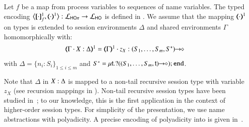 \documentclass[runningheads]{llncs}
\begin{document}
{\begin{definition}
\label{d:enc:hopitoho}
Let $f$ be a map from process variables to sequences of name variables.
%
The typed encoding 
$\enco{\map{\cdot}^{1}_f, \mapt{\cdot}^{1} %
}: \tyl{L}_{\HOp} \to \tyl{L}_{\HO}$ is defined in 
. 
We assume that the mapping $(\!\!\langle\cdot\rangle\!\!)^{1}$ on types is extended to 
session environments $\Delta$
and
shared environments $\Gamma$ homomorphically with: 
\[
	\begin{array}{l}
		\tmap{\Gamma \cat \varp{X}:\Delta}{1}  =  \tmap{\Gamma}{1} \cat z_X:\shot{(S_1,\ldots,S_m,S^*)} \ 
	\end{array}
\]
with
 $\Delta = \{n_i:S_i\}_{1\leq i\leq m}$ and
$S^* = \mu\mathsf{t}.? ((S_1,\ldots,S_m,\mathsf{t})\!\! \rightarrow\!\! \diamond) ; \mathtt{end}$.
\end{definition}



\noi Note that $\Delta$ in $X:\Delta$ is mapped to a non-tail
recursive session type with variable $z_X$ (see recursion mappings in ).
Non-tail
recursive session types {have been} studied in~\cite{DBLP:journals/corr/abs-1202-2086,TGC14};
{to our knowledge,}
this is the first application in the
context of higher-order session types.
For simplicity of the presentation, %
we use name abstractions with polyadicity.
A precise encoding of polyadicity into \HO is given in~.

}
\end{document}
